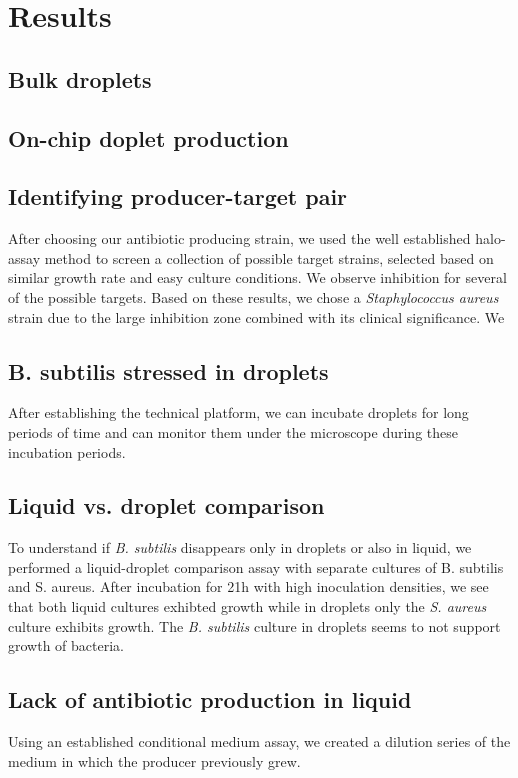 \chapter{Results}

\section{Bulk droplets}

\section{On-chip doplet production}

\section{Identifying producer-target pair}
After choosing our antibiotic producing strain, we used the well established halo-assay method to screen a collection of possible target strains, selected based on similar growth rate and easy culture conditions. We observe inhibition for several of the possible targets. Based on these results, we chose a \textit{Staphylococcus aureus} strain due to the large inhibition zone combined with its clinical significance. We 
\section{B. subtilis stressed in droplets}
After establishing the technical platform, we can incubate droplets for long periods of time and can monitor them under the microscope during these incubation periods. 
\section{Liquid vs. droplet comparison}
To understand if \textit{B. subtilis} disappears only in droplets or also in liquid, we performed a liquid-droplet comparison assay with separate cultures of B. subtilis and S. aureus. After incubation for 21h with high inoculation densities, we see that both liquid cultures exhibted growth while in droplets only the \textit{S. aureus} culture exhibits growth. The \textit{B. subtilis} culture in droplets seems to not support growth of bacteria.
\section{Lack of antibiotic production in liquid}
Using an established conditional medium assay, we created a dilution series of the medium in which the producer previously grew. 